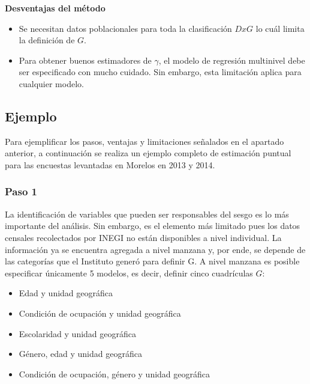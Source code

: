 \documentclass[]{article}
\begin{document}
\textbf{Desventajas del método}

\begin{itemize}
\itemsep1pt\parskip0pt
\item
  Se necesitan datos poblacionales para toda la clasificación $DxG$ lo
  cuál limita la definición de $G$.
\item
  Para obtener buenos estimadores de $\gamma$, el modelo de regresión
  multinivel debe ser especificado con mucho cuidado. Sin embargo, esta
  limitación aplica para cualquier modelo.
\end{itemize}

\pagebreak

\subsection{Ejemplo}\label{ejemplo}

Para ejemplificar los pasos, ventajas y limitaciones señalados en el
apartado anterior, a continuación se realiza un ejemplo completo de
estimación puntual para las encuestas levantadas en Morelos en 2013 y
2014.

\subsubsection{Paso 1}\label{paso-1}

La identificación de variables que pueden ser responsables del sesgo es
lo más importante del análisis. Sin embargo, es el elemento más limitado
pues los datos censales recolectados por INEGI no están disponibles a
nivel individual. La información ya se encuentra agregada a nivel
manzana y, por ende, se depende de las categorías que el Instituto
generó para definir G. A nivel manzana es posible especificar únicamente
5 modelos, es decir, definir cinco cuadrículas $G$:

\begin{itemize}
\itemsep1pt\parskip0pt
\item
  Edad y unidad geográfica
\item
  Condición de ocupación y unidad geográfica
\item
  Escolaridad y unidad geográfica
\item
  Género, edad y unidad geográfica
\item
  Condición de ocupación, género y unidad geográfica
\end{itemize}
\end{document}
